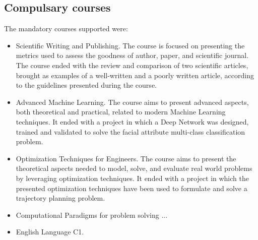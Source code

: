 \subsection{Compulsary courses}
The mandatory courses supported were:
\begin{itemize}
    \item Scientific Writing and Publishing. The course is focused on presenting the metrics used to assess the goodness of author, paper, and scientific journal. The course ended with the review and comparison of two scientific articles, brought as examples of a well-written and a poorly written article, according to the guidelines presented during the course. 
    \item Advanced Machine Learning. The course aims to present advanced aspects, both theoretical and practical, related to modern Machine Learning techniques. It ended with a project in which a Deep Network was designed, trained and validated to solve the facial attribute multi-class classification problem.
    \item Optimization Techniques for Engineers. The course aims to present the theoretical aspects needed to model, solve, and evaluate real world problems by leveraging optimization techniques. It ended with a project in which the presented optimization techniques have been used to formulate and solve a trajectory planning problem.
    \item Computational Paradigms for problem solving ...
    \item English Language C1.
\end{itemize}